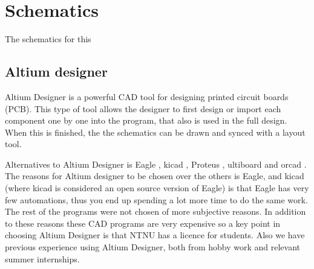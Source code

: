 \section{Schematics}
The schematics for this 

\subsection{Altium designer}
\label{altium}
Altium Designer \citep{altium} is a powerful CAD tool for designing printed circuit boards (PCB). This type of tool allows the designer to first design or import each component one by one into the program, that also is used in the full design. When this is finished, the the schematics can be drawn and synced with a layout tool.

Alternatives to Altium Designer is Eagle \citep{eagle}, kicad \citep{kicad}, Proteus \citep{proteus}, ultiboard \citep{ultiboard} and orcad \citep{orcad}. The reasons for Altium designer to be chosen over the others is Eagle, and kicad (where  kicad is considered an open source version of Eagle) is that Eagle has very few automations, thus you end up spending a lot more time to do the same work. The rest of the programs were not chosen of more subjective reasons. In addition to these reasons these CAD programs are very expensive so a key point in choosing Altium Designer is that NTNU has a licence for students. Also we have previous experience using Altium Designer, both from hobby work and relevant summer internships.